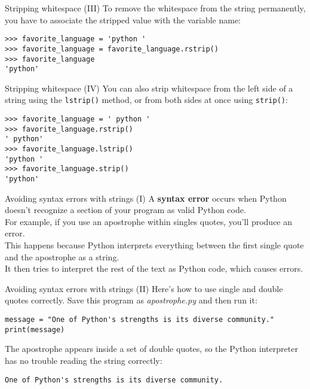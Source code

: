 \documentclass[aspectratio=169]{beamer}
\begin{document}
\begin{frame}[fragile]{Stripping whitespace (III)}
    To remove the whitespace from the string permanently, you have to associate the stripped value with the variable name:
    \vspace{10pt}
    \begin{Verbatim}
>>> favorite_language = 'python '
>>> favorite_language = favorite_language.rstrip()
>>> favorite_language
'python'
    \end{Verbatim}
\end{frame}


\begin{frame}[fragile]{Stripping whitespace (IV)}
    You can also strip whitespace from the left side of a string using the \texttt{lstrip()} method, or from both sides at once using \texttt{strip()}:
    \vspace{10pt}
    \begin{Verbatim}
>>> favorite_language = ' python '
>>> favorite_language.rstrip()
' python'
>>> favorite_language.lstrip()
'python '
>>> favorite_language.strip()
'python'
    \end{Verbatim}
\end{frame}


\begin{frame}[fragile]{Avoiding syntax errors with strings (I)}
    A \textbf{syntax error} occurs when Python doesn't recognize a section of your program as valid Python code. \\
    \vspace{15pt}
    For example, if you use an apostrophe within singles quotes, you'll produce an error. \\
    \vspace{10pt}
    This happens because Python interprets everything between the first single quote and the apostrophe as a string. \\
    \vspace{10pt}
    It then tries to interpret the rest of the text as Python code, which causes errors.
\end{frame}


\begin{frame}[fragile]{Avoiding syntax errors with strings (II)}
    Here's how to use single and double quotes correctly.
    Save this program as \textit{apostrophe.py} and then run it:
    \vspace{10pt}
    \begin{Verbatim}
message = "One of Python's strengths is its diverse community."
print(message)
    \end{Verbatim}
    \vspace{15pt}
    The apostrophe appears inside a set of double quotes, so the Python interpreter has no trouble reading the string correctly:
    \vspace{10pt}
    \begin{Verbatim}
One of Python's strengths is its diverse community.
    \end{Verbatim}
\end{frame}
\end{document}
